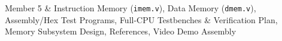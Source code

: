 Member 5 & Instruction Memory (\texttt{imem.v}), Data Memory (\texttt{dmem.v}), Assembly/Hex Test Programs, Full-CPU Testbenches & Verification Plan, Memory Subsystem Design, References, Video Demo Assembly \\